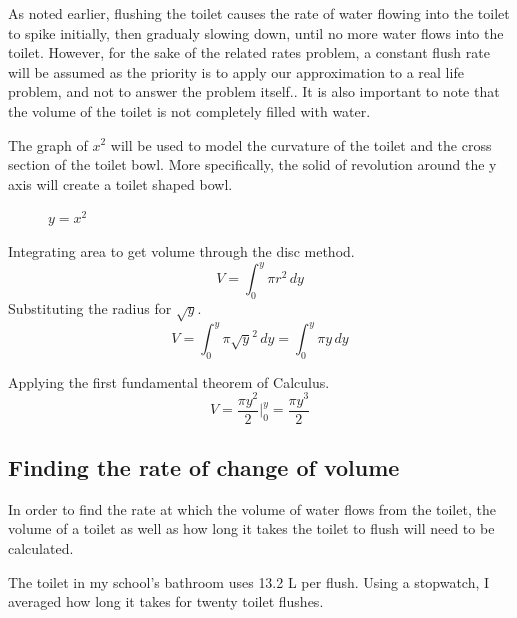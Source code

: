 \documentclass[12pt, titlepage]{article}
\begin{document}
As noted earlier, flushing the toilet causes the rate of water flowing into the toilet to spike initially, then gradualy slowing down, until no more water flows into the toilet. However, for the sake of the related rates problem, a constant flush rate will be assumed as the priority is to apply our approximation to a real life problem, and not to answer the problem itself.. It is also important to note that the volume of the toilet is not completely filled with water.  

The graph of \(x^{2}\) will be used to model the curvature of the toilet and the cross section of the toilet bowl. More specifically, the solid of revolution around the y axis will create a toilet shaped bowl. 

\begin{figure}[H]
\centering
    \caption[]{\(y=x^2\)}
\end{figure}

Integrating area to get volume through the disc method.
\begin{equation}
    V = \int^y_0 \pi r^2\,dy
\end{equation}
Substituting the radius for \(\sqrt{y}\).
\begin{equation}
    V = \int^y_0 \pi \sqrt{y}^2\,dy  = \int^y_0 \pi y\,dy 
\end{equation}

Applying the first fundamental theorem of Calculus.
\begin{equation}
    V = \frac{ \pi y^2 }{2} \biggr \rvert^y_0 = \frac{\pi y^3}{2}
\end{equation}

\subsection{Finding the rate of change of volume}
In order to find the rate at which the volume of water flows from the toilet, the volume of a toilet as well as how long it takes the toilet to flush will need to be calculated. 

\pagebreak
The toilet in my school’s bathroom uses 13.2 L per flush. Using a stopwatch, I averaged how long it takes for twenty toilet flushes. 
\end{document}

